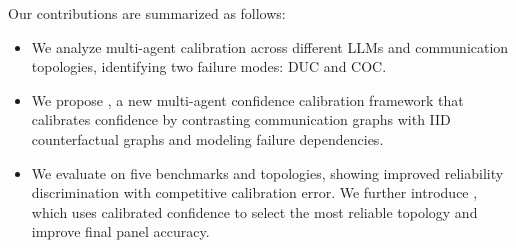 Our contributions are summarized as follows:
\begin{itemize}
    \item We analyze multi-agent calibration across different LLMs and communication topologies, identifying two failure modes: DUC and COC.
    \item We propose \methodname{}, a new multi-agent confidence calibration framework that calibrates confidence by contrasting communication graphs with IID counterfactual graphs and modeling failure dependencies.

    \item We evaluate \methodname{} on five benchmarks and  topologies, showing improved reliability discrimination with competitive calibration error. We further introduce \select{}, which uses calibrated confidence to select the most reliable topology  and improve final panel accuracy.
\end{itemize}


